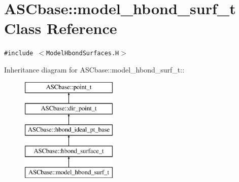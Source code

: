 \section{ASCbase::model\_\-hbond\_\-surf\_\-t Class Reference}
\label{classASCbase_1_1model__hbond__surf__t}
{\tt \#include $<$Model\-Hbond\-Surfaces.H$>$}

Inheritance diagram for ASCbase::model\_\-hbond\_\-surf\_\-t::\begin{figure}[H]
\begin{center}
\leavevmode
\includegraphics[height=5cm]{classASCbase_1_1model__hbond__surf__t}
\end{center}
\end{figure}
